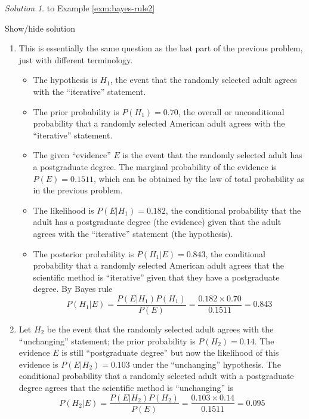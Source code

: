 \documentclass[
]{book}
\providecommand{\tightlist}{%
  \setlength{\itemsep}{0pt}\setlength{\parskip}{0pt}}
\theoremstyle{definition}
\theoremstyle{definition}
\theoremstyle{definition}
\theoremstyle{remark}
\newtheorem*{solution}{Solution}
\begin{document}
\begin{solution}
{}to Example \ref{exm:bayes-rule2}
\end{solution}

Show/hide solution

\begin{enumerate}
\def\labelenumi{\arabic{enumi}.}
\tightlist
\item
  This is essentially the same question as the last part of the previous problem, just with different terminology.

  \begin{itemize}
  \tightlist
  \item
    The hypothesis is \(H_1\), the event that the randomly selected adult agrees with the ``iterative'' statement.
  \item
    The prior probability is \(P(H_1) = 0.70\), the overall or unconditional probability that a randomly selected American adult agrees with the ``iterative'' statement.
  \item
    The given ``evidence'' \(E\) is the event that the randomly selected adult has a postgraduate degree. The marginal probability of the evidence is \(P(E)=0.1511\), which can be obtained by the law of total probability as in the previous problem.
  \item
    The likelihood is \(P(E | H_1) = 0.182\), the conditional probability that the adult has a postgraduate degree (the evidence) given that the adult agrees with the ``iterative'' statement (the hypothesis).
  \item
    The posterior probability is \(P(H_1 |E)=0.843\), the conditional probability that a randomly selected American adult agrees that the scientific method is ``iterative'' given that they have a postgraduate degree. By Bayes rule
    \[
     P(H_1 | E) = \frac{P(E | H_1) P(H_1)}{P(E)} = \frac{0.182 \times 0.70}{0.1511} = 0.843
     \]
  \end{itemize}
\item
  Let \(H_2\) be the event that the randomly selected adult agrees with the ``unchanging'' statement; the prior probability is \(P(H_2) = 0.14\). The evidence \(E\) is still ``postgraduate degree'' but now the likelihood of this evidence is \(P(E | H_2) = 0.103\) under the ``unchanging'' hypothesis. The conditional probability that a randomly selected adult with a postgraduate degree agrees that the scientific method is ``unchanging'' is
  \[
   P(H_2 | E) = \frac{P(E | H_2) P(H_2)}{P(E)} = \frac{0.103 \times 0.14}{0.1511} = 0.095
\]
\end{enumerate}
\end{document}
